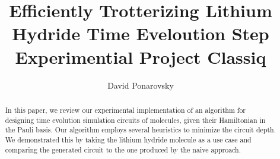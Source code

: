 \documentclass{article}
\begin{document}
    
\title{ Efficiently Trotterizing Lithium Hydride Time Eveloution Step  \\  Experimential Project  Classiq}
\author{David Ponarovsky}
\maketitle

\begin{abstract} 
In this paper, we review our experimental implementation of an algorithm for designing time evolution simulation circuits of molecules, given their Hamiltonian in the Pauli basis. Our algorithm employs several heuristics to minimize the circuit depth. We demonstrated this by taking the lithium hydride molecule as a use case and comparing the generated circuit to the one produced by the naive approach.
\end{abstract}
\end{document}
